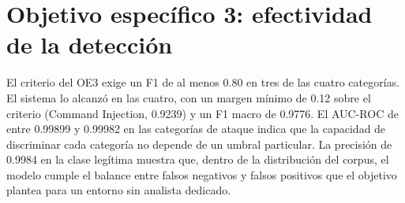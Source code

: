 \section{Objetivo específico 3: efectividad de la detección}
\label{sec:dis-oe3}

El criterio del OE3 exige un F1 de al menos 0.80 en tres de las cuatro categorías. El sistema lo
alcanzó en las cuatro, con un margen mínimo de 0.12 sobre el criterio (Command Injection, 0.9239) y
un F1 macro de 0.9776. El AUC-ROC de entre 0.99899 y 0.99982 en las categorías de ataque indica que la capacidad de discriminar
cada categoría no depende de un umbral particular. La precisión de 0.9984 en la clase legítima
muestra que, dentro de la distribución del corpus, el modelo cumple el balance entre falsos
negativos y falsos positivos que el objetivo plantea para un entorno sin analista dedicado.

